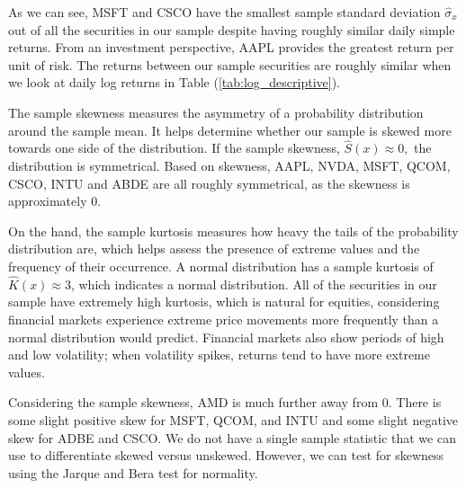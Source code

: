 \documentclass[12pt]{article}
\begin{document}
As we can see, MSFT and CSCO have the smallest sample standard deviation $\hat{\sigma}_x$ out of all the securities in our sample despite having roughly similar daily simple returns. From an investment perspective, AAPL provides the greatest return per unit of risk. The returns between our sample securities are roughly similar when we look at daily log returns in Table (\ref{tab:log_descriptive}).

The sample skewness measures the asymmetry of a probability distribution around the sample mean. It helps determine whether our sample is skewed more towards one side of the distribution. If the sample skewness, $\hat{S}(x)\approx 0,$ the distribution is symmetrical. Based on skewness, AAPL, NVDA, MSFT, QCOM, CSCO, INTU and ABDE are all roughly symmetrical, as the skewness is approximately 0. 

On the hand, the sample kurtosis measures how heavy the tails of the probability distribution are, which helps assess the presence of extreme values and the frequency of their occurrence. A normal distribution has a sample kurtosis of  $\hat{K}(x)\approx 3$, which indicates a normal distribution. All of the securities in our sample have extremely high kurtosis, which is natural for equities, considering financial markets experience extreme price movements more frequently than a normal distribution would predict. Financial markets also show periods of high and low volatility; when volatility spikes, returns tend to have more extreme values.

Considering the sample skewness, AMD is much further away from 0. There is some slight positive skew for MSFT, QCOM, and INTU and some slight negative skew for ADBE and CSCO. We do not have a single sample statistic that we can use to differentiate skewed versus unskewed. However, we can test for skewness using the Jarque and Bera test for normality.
\end{document}
